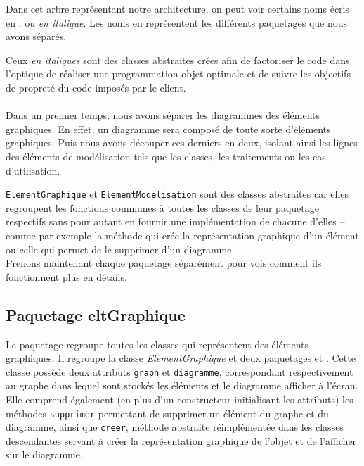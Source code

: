 \documentclass[12pt,a4paper,openany]{report}
\begin{document}
		Dans cet arbre représentant notre architecture, on peut voir certains noms écris en . 
		ou \textit{en italique}. 
		Les noms en  représentent les différents paquetages que nous avons séparés.
		
		Ceux \textit{en italiques} sont des classes abstraites crées afin de factoriser le code dans l'optique de réaliser une programmation objet optimale 
		et de suivre les objectifs de propreté du code imposés par le client.\vspace{2px}
	\paragraph{}	
		Dans un premier temps, nous avons séparer les diagrammes des éléments graphiques. En effet, un diagramme sera composé de
		toute sorte d'éléments graphiques. Puis nous avons découper ces derniers en deux, isolant ainsi les lignes des éléments
		de modélisation tels que les classes, les traitements ou les cas d'utilisation.\vspace{2px}
		
		\texttt{ElementGraphique} et \texttt{ElementModelisation} sont des classes abstraites car elles regroupent les fonctions communes
		à toutes les classes de leur paquetage respectifs sans pour autant en fournir une implémentation de chacune d'elles -- comme par exemple la méthode qui crée la
		représentation graphique d'un élément ou celle qui permet de le supprimer d'un diagramme.\\ 
	Prenons maintenant chaque paquetage séparément pour vois comment ils fonctionnent plus en détails.
	\subsection{Paquetage eltGraphique}
	Le paquetage  regroupe toutes les classes qui représentent des éléments graphiques. Il regroupe la classe 
	\textit{ElementGraphique} et deux paquetages  et . Cette classe possède deux attributs 
	\texttt{graph} et \texttt{diagramme}, correspondant respectivement au graphe dans lequel sont stockés les éléments 
	et le diagramme afficher à l'écran. Elle comprend également (en plus d'un constructeur initialisant les attributs) 
	les méthodes \texttt{supprimer} permettant de supprimer un élément du graphe et du diagramme, ainsi que \texttt{creer}, 
	méthode abstraite réimplémentée dans les classes descendantes servant à créer la représentation graphique de l'objet 
	et de l'afficher sur le diagramme.
\end{document}
